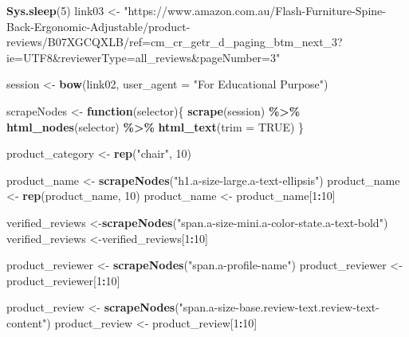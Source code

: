 \documentclass[
]{article}
\newenvironment{Shaded}{\begin{snugshade}}{\end{snugshade}}
\newcommand{\AttributeTok}[1]{\textcolor[rgb]{0.13,0.29,0.53}{#1}}
\newcommand{\ConstantTok}[1]{\textcolor[rgb]{0.56,0.35,0.01}{#1}}
\newcommand{\ControlFlowTok}[1]{\textcolor[rgb]{0.13,0.29,0.53}{\textbf{#1}}}
\newcommand{\DecValTok}[1]{\textcolor[rgb]{0.00,0.00,0.81}{#1}}
\newcommand{\FunctionTok}[1]{\textcolor[rgb]{0.13,0.29,0.53}{\textbf{#1}}}
\newcommand{\NormalTok}[1]{#1}
\newcommand{\OtherTok}[1]{\textcolor[rgb]{0.56,0.35,0.01}{#1}}
\newcommand{\SpecialCharTok}[1]{\textcolor[rgb]{0.81,0.36,0.00}{\textbf{#1}}}
\newcommand{\StringTok}[1]{\textcolor[rgb]{0.31,0.60,0.02}{#1}}
\begin{document}
\begin{Shaded}
\begin{Highlighting}[]
   \FunctionTok{Sys.sleep}\NormalTok{(}\DecValTok{5}\NormalTok{)}
\NormalTok{link03 }\OtherTok{\textless{}{-}} \StringTok{"https://www.amazon.com.au/Flash{-}Furniture{-}Spine{-}Back{-}Ergonomic{-}Adjustable/product{-}reviews/B07XGCQXLB/ref=cm\_cr\_getr\_d\_paging\_btm\_next\_3?ie=UTF8\&reviewerType=all\_reviews\&pageNumber=3"}


\NormalTok{  session }\OtherTok{\textless{}{-}} \FunctionTok{bow}\NormalTok{(link02,}
               \AttributeTok{user\_agent =} \StringTok{"For Educational Purpose"}\NormalTok{)}

\NormalTok{  scrapeNodes }\OtherTok{\textless{}{-}} \ControlFlowTok{function}\NormalTok{(selector)\{}
    \FunctionTok{scrape}\NormalTok{(session) }\SpecialCharTok{\%\textgreater{}\%}
      \FunctionTok{html\_nodes}\NormalTok{(selector) }\SpecialCharTok{\%\textgreater{}\%}
      \FunctionTok{html\_text}\NormalTok{(}\AttributeTok{trim =} \ConstantTok{TRUE}\NormalTok{)}
\NormalTok{  \}}

\NormalTok{  product\_category }\OtherTok{\textless{}{-}} \FunctionTok{rep}\NormalTok{(}\StringTok{"chair"}\NormalTok{, }\DecValTok{10}\NormalTok{)}

\NormalTok{  product\_name }\OtherTok{\textless{}{-}} \FunctionTok{scrapeNodes}\NormalTok{(}\StringTok{"h1.a{-}size{-}large.a{-}text{-}ellipsis"}\NormalTok{)}
\NormalTok{  product\_name }\OtherTok{\textless{}{-}} \FunctionTok{rep}\NormalTok{(product\_name, }\DecValTok{10}\NormalTok{)}
\NormalTok{  product\_name }\OtherTok{\textless{}{-}}\NormalTok{ product\_name[}\DecValTok{1}\SpecialCharTok{:}\DecValTok{10}\NormalTok{]}
  
\NormalTok{  verified\_reviews }\OtherTok{\textless{}{-}}\FunctionTok{scrapeNodes}\NormalTok{(}\StringTok{"span.a{-}size{-}mini.a{-}color{-}state.a{-}text{-}bold"}\NormalTok{)}
\NormalTok{  verified\_reviews }\OtherTok{\textless{}{-}}\NormalTok{verified\_reviews[}\DecValTok{1}\SpecialCharTok{:}\DecValTok{10}\NormalTok{]}
  
\NormalTok{  product\_reviewer }\OtherTok{\textless{}{-}} \FunctionTok{scrapeNodes}\NormalTok{(}\StringTok{"span.a{-}profile{-}name"}\NormalTok{)}
\NormalTok{  product\_reviewer }\OtherTok{\textless{}{-}}\NormalTok{ product\_reviewer[}\DecValTok{1}\SpecialCharTok{:}\DecValTok{10}\NormalTok{]}
  
\NormalTok{  product\_review }\OtherTok{\textless{}{-}} \FunctionTok{scrapeNodes}\NormalTok{(}\StringTok{"span.a{-}size{-}base.review{-}text.review{-}text{-}content"}\NormalTok{)}
\NormalTok{  product\_review }\OtherTok{\textless{}{-}}\NormalTok{ product\_review[}\DecValTok{1}\SpecialCharTok{:}\DecValTok{10}\NormalTok{]}
  

\end{Highlighting}
\end{Shaded}
\end{document}
